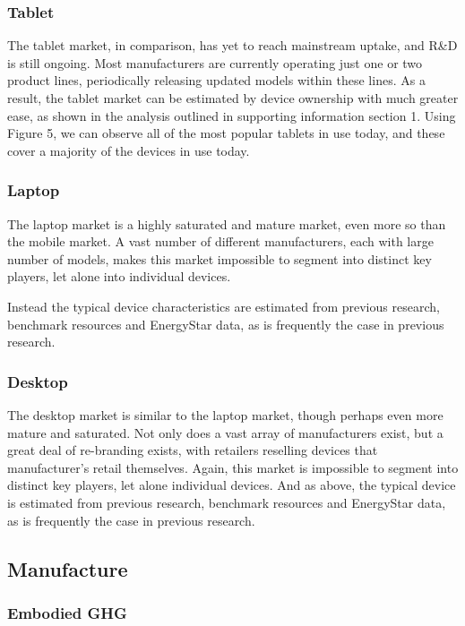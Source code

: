 \documentclass[conference]{IEEEtran}
\begin{document}
\subsubsection{Tablet}

The tablet market, in comparison, has yet to reach mainstream uptake,
and R\&D is still ongoing. Most manufacturers are currently operating
just one or two product lines, periodically releasing updated models
within these lines. As a result, the tablet market can be estimated by
device ownership with much greater ease, as shown in the analysis
outlined in supporting information section 1. Using Figure 5, we can
observe all of the most popular tablets in use today, and these cover
a majority of the devices in use today.

\subsubsection{Laptop}

The laptop market is a highly saturated and mature market, even more
so than the mobile market. A vast number of different manufacturers,
each with large number of models, makes this market impossible to
segment into distinct key players, let alone into individual devices.

Instead the typical device characteristics are estimated from previous
research, benchmark resources and EnergyStar data, as is frequently
the case in previous research.

\subsubsection{Desktop}

The desktop market is similar to the laptop market, though perhaps
even more mature and saturated. Not only does a vast array of
manufacturers exist, but a great deal of re-branding exists, with
retailers reselling devices that manufacturer’s retail
themselves. Again, this market is impossible to segment into distinct
key players, let alone individual devices. And as above, the typical
device is estimated from previous research, benchmark resources and
EnergyStar data, as is frequently the case in previous research.


\subsection{Manufacture}

\subsubsection{Embodied GHG}
\end{document}

